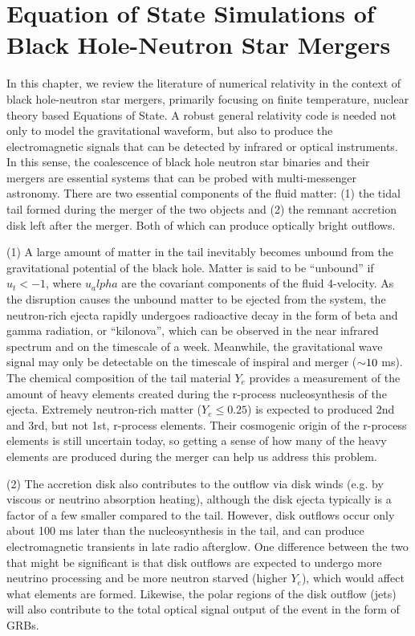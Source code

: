 \chapter{Equation of State Simulations of Black Hole-Neutron Star Mergers}
\label{chap:chapter-4}

In this chapter, we review the literature of numerical relativity in the context of black hole-neutron star mergers, primarily focusing on finite temperature, nuclear theory based Equations of State.  
A robust general relativity code is needed not only to model the gravitational waveform, but also to produce the electromagnetic signals that can be detected by infrared or optical instruments.  
In this sense, the coalescence of black hole neutron star binaries and their mergers are essential systems that can be probed with multi-messenger astronomy.   
There are two essential components of the fluid matter: (1) the tidal tail formed during the merger of the two objects and (2) the remnant accretion disk left after the merger.  
Both of which can produce optically bright outflows.

(1) A large amount of matter in the tail inevitably becomes unbound from the gravitational potential of the black hole.  Matter is said to be ``unbound'' if $u_t < -1$, where $u_alpha$ are the covariant components of the fluid 4-velocity.  
As the disruption causes the unbound matter to be ejected from the system, the neutron-rich ejecta rapidly undergoes radioactive decay in the form of beta and gamma radiation, or ``kilonova'', which can be observed in the near infrared spectrum and on the timescale of a week.
Meanwhile, the gravitational wave signal may only be detectable on the timescale of inspiral and merger ($\mathord{\sim}10$ ms).
The chemical composition of the tail material $Y_e$ provides a measurement of the amount of heavy elements created during the r-process nucleosynthesis of the ejecta. 
Extremely neutron-rich matter ($Y_e \le 0.25$) is expected to produced 2nd and 3rd, but not 1st, r-process elements.  
Their cosmogenic origin of the r-process elements is still uncertain today, so getting a sense of how many of the heavy elements are produced during the merger can help us address this problem.
  
(2)  The accretion disk also contributes to the outflow via disk winds (e.g. by viscous or neutrino absorption heating), although the disk ejecta typically is a factor of a few smaller compared to the tail.
However, disk outflows occur only about 100 ms later than the nucleosynthesis in the tail, and can produce electromagnetic transients in late radio afterglow.
One difference between the two that might be significant is that disk outflows are expected to undergo more neutrino processing and be more neutron starved (higher $Y_e$), which would affect what elements are formed.
Likewise, the polar regions of the disk outflow (jets) will also contribute to the total optical signal output of the event in the form of GRBs.


